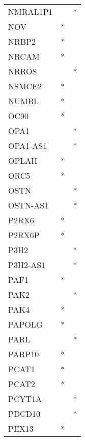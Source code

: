 \begin{longtable}{lcc}
NMRAL1P1         &                &          * \\
NOV              &              * &            \\
NRBP2            &              * &            \\
NRCAM            &              * &            \\
NRROS            &                &          * \\
NSMCE2           &              * &            \\
NUMBL            &              * &            \\
OC90             &              * &            \\
OPA1             &                &          * \\
OPA1-AS1         &                &          * \\
OPLAH            &              * &            \\
ORC5             &              * &            \\
OSTN             &                &          * \\
OSTN-AS1         &                &          * \\
P2RX6            &              * &            \\
P2RX6P           &              * &            \\
P3H2             &                &          * \\
P3H2-AS1         &                &          * \\
PAF1             &              * &            \\
PAK2             &                &          * \\
PAK4             &              * &            \\
PAPOLG           &              * &            \\
PARL             &                &          * \\
PARP10           &              * &            \\
PCAT1            &              * &            \\
PCAT2            &              * &            \\
PCYT1A           &                &          * \\
PDCD10           &                &          * \\
PEX13            &              * &            \\

\end{longtable}
